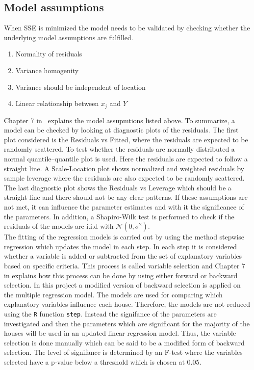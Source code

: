 \subsection{Model assumptions}
\noindent When SSE is minimized the model needs to be validated by checking whether the underlying model assumptions are fulfilled.
\begin{enumerate} [label=\textbf{\arabic*}]
    \item Normality of residuals
    \item Variance homogenity
    \item Variance should be independent of location
    \item Linear relationship between $x_j$ and $Y$
\end{enumerate}
Chapter 7 in \cite{Stat_bog} explains the model assupmtions listed above. To summarize, a model can be checked by looking at diagnostic plots of the residuals. The first plot considered is the Residuals vs Fitted, where the residuals are expected to be randomly scattered. To test whether the residuals are normally distributed a normal quantile–quantile plot is used. Here the residuals are expected to follow a straight line. A Scale-Location plot shows normalized and weighted residuals by sample leverage where the residuals are also expected to be randomly scattered. The last diagnostic plot shows the Residuals vs Leverage which should be a straight line and there should not be any clear patterns. If these assumptions are not met, it can influence the parameter estimates and with it the significance of the parameters. In addition, a Shapiro-Wilk test is performed to check if the residuals of the models are i.i.d with $\mathcal{N}(0,\sigma^2)$. \\

\noindent The fitting of the regression models is carried out by using the method stepwise regression which updates the model in each step. In each step it is considered whether a variable is added or subtracted from the set of explanatory variables based on specific criteria. This process is called variable selection and Chapter 7 in \cite{Stat_bog2} explains how this process can be done by using either forward or backward selection. In this project a modified version of backward selection is applied on the multiple regression model. The models are used for comparing which explanatory variables influence each house. Therefore, the models are not reduced using the \texttt{R} function \texttt{step}. Instead the signifance of the parameters are investigated and then the parameters which are significant for the majority of the houses will be used in an updated linear regression model. Thus, the variable selection is done manually which can be said to be a modified form of backward selection. The level of signifance is determined by an F-test where the variables selected have a p-value below a threshold which is chosen at 0.05.\\

